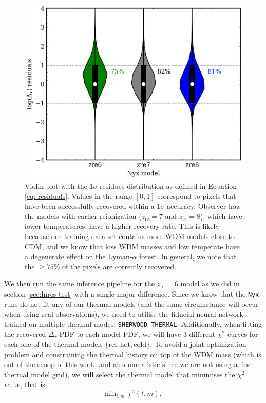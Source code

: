 \begin{figure}
    \centering
    \includegraphics[width=0.8\linewidth]{img/ML/violin_nyx.png}
    \caption{Violin plot with the $1\sigma$ residues distribution as defined in Equation \ref{eq: residuals}. Values in the range $[0,1]$ correspond to pixels that have been successfully recovered within a $1\sigma$ accuracy. Observer how the models with earlier reionization ($z_\mathrm{re}=7$ and $z_\mathrm{re}=8$), which have lower temperatures, have a higher recovery rate. This is likely because our training data set contains more WDM models close to CDM, and we know that loss WDM masses and low temperate have a degenerate effect on the Lyman-$\alpha$ forest. In general, we note that the $\geq 75 \%$ of the pixels are correctly recovered.}
    \label{fig: nyx violin}
\end{figure}
We then run the same inference pipeline for the $z_\mathrm{re}=6$ model as we did in section \ref{sec:hires test} with a single major difference. Since we know that the \texttt{Nyx} runs do not fit any of our thermal models (and the same circumstance will occur when using real observations), we need to utilise the fiducial neural network trained on multiple thermal modes, \texttt{SHERWOOD THERMAL}. Additionally, when fitting the recovered $\Delta_\tau$ PDF to each model PDF, we will have 3 different $\chi^2$ curves for each one of the thermal models $\{\mathrm{ref}, \mathrm{hot}, \mathrm{cold} \}$. To avoid a joint optimization problem and constraining the thermal history on top of the WDM mass (which is out of the scoop of this work, and also unrealistic since we are not using a fine thermal model grid), we will select the thermal model that minimises the $\chi^2$ value, that is
\begin{equation}\label{eq: chi thermal def}
    \mathrm{min}_{t,m} \, \, \chi^2(t,m),
\end{equation}
